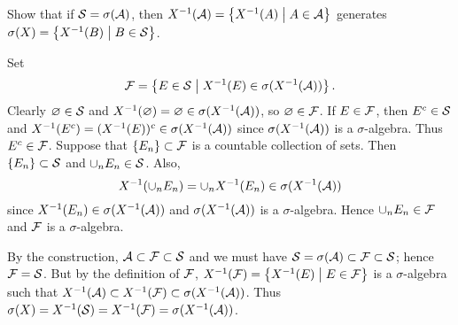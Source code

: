 \documentclass[a4paper, 12pt]{article}
\begin{document}
\begin{exercise}{1.5}
    Show that if $\S = \sigma(\A)$, then $X^{-1}(\A) = \Set{X^{-1}(A)}{A\in\A}$ 
    generates $\sigma(X) = \Set{X^{-1}(B)}{B\in\S}$.
\end{exercise}
\begin{solution}
    Set
    \begin{equation*}
        \F = \Set{E\in\S}{X^{-1}(E)\in\sigma(X^{-1}(\A))}.
    \end{equation*} 
    Clearly $\varnothing\in\S$ and $X^{-1}(\varnothing) = \varnothing\in\sigma(X^{-1}(\A))$, so 
    $\varnothing\in\F$. If $E\in\F$, then $E^c\in\S$ and $X^{-1}(E^c) = (X^{-1}(E))^c\in\sigma(X^{-1}(\A))$
    since $\sigma(X^{-1}(\A))$ is a $\sigma$-algebra. Thus $E^c\in\F$. Suppose that 
    $\set{E_n}\subset\F$ is a countable collection of sets. Then $\set{E_n}\subset\S$ 
    and $\cup_n E_n\in\S$. Also, 
    \begin{equation*}
        X^{-1}(\cup_n E_n) = \cup_n X^{-1}(E_n)\in\sigma(X^{-1}(\A))
    \end{equation*}
    since $X^{-1}(E_n)\in\sigma(X^{-1}(\A))$ and $\sigma(X^{-1}(\A))$ is a 
    $\sigma$-algebra. Hence $\cup_n E_n\in\F$ and $\F$ is a $\sigma$-algebra.
    
    By the construction, $\A\subset\F\subset\S$ and we must have
    $\S = \sigma(\A)\subset\F\subset\S$; hence $\F = \S$. But by the definition
    of $\F$, $X^{-1}(\F) = \Set{X^{-1}(E)}{E\in\F}$ is a $\sigma$-algebra such 
    that $X^{-1}(\A)\subset X^{-1}(\F)\subset\sigma(X^{-1}(\A))$. Thus 
    $\sigma(X) = X^{-1}(\S) = X^{-1}(\F) = \sigma(X^{-1}(\A))$.
\end{solution}
\end{document}
